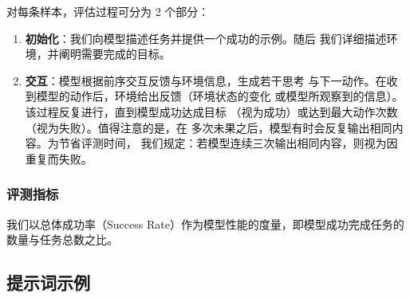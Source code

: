 对每条样本，评估过程可分为 2 个部分：
\begin{enumerate}
    \item \textbf{初始化}：我们向模型描述任务并提供一个成功的示例。随后
          我们详细描述环境，并阐明需要完成的目标。
    \item \textbf{交互}：模型根据前序交互反馈与环境信息，生成若干思考
          与下一动作。在收到模型的动作后，环境给出反馈（环境状态的变化
          或模型所观察到的信息）。该过程反复进行，直到模型成功达成目标
          （视为成功）或达到最大动作次数（视为失败）。值得注意的是，在
          多次未果之后，模型有时会反复输出相同内容。为节省评测时间，
          我们规定：若模型连续三次输出相同内容，则视为因重复而失败。
\end{enumerate}

\subsubsection*{评测指标}

我们以总体成功率（Success Rate）作为模型性能的度量，即模型成功完成任务的
数量与任务总数之比。

\subsection{提示词示例}

